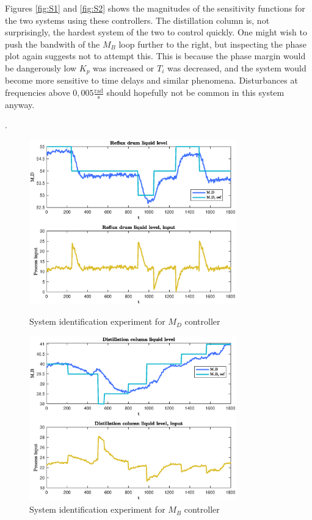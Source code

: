 \documentclass[12pt]{article}
\begin{document}
Figures \ref{fig:S1} and \ref{fig:S2} shows the magnitudes of the sensitivity functions for the two systems using these controllers. The distillation column is, not surprisingly, the hardest system of the two to control quickly. One might wish to push the bandwith of the $M_B$ loop further to the right, but inspecting the phase plot again suggests not to attempt this. This is because the phase margin would be dangerously low $K_p$ was increased or $T_i$ was decreased, and the system would become more sensitive to time delays and similar phenomena. Disturbances at frequencies above $0,005 \frac{\textrm{rad}}{\textrm{s}}$ should hopefully not be common in this system anyway.

.

\begin{figure}[p]
\centering
\includegraphics[width=0.8\textwidth]{../Systemanalyse/Log_Data_to_Matlab/Figurer/Identifisering/MD_eksperiment.eps}
\caption{System identification experiment for $M_D$ controller}
\label{fig:MD_experiment}

\includegraphics[width=0.8\textwidth]{../Systemanalyse/Log_Data_to_Matlab/Figurer/Identifisering/MB_eksperiment.eps}
\caption{System identification experiment for $M_B$ controller}
\label{fig:MB_experiment}
\end{figure}
\end{document}
